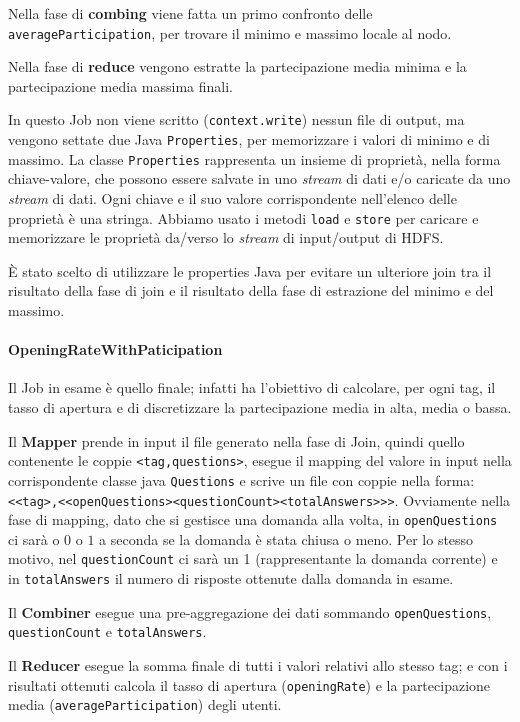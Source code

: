 \documentclass[10pt]{article}
\begin{document}
Nella fase di \textbf{combing} viene fatta un primo confronto delle\\
\texttt{averageParticipation}, per trovare il minimo e massimo locale al nodo.

Nella fase di \textbf{reduce} vengono estratte la partecipazione media minima e la partecipazione media massima finali.

In questo Job non viene scritto (\texttt{context.write}) nessun file di output, ma vengono settate due Java \texttt{Properties}, per memorizzare i valori di minimo e di massimo.
La classe \texttt{Properties} rappresenta un insieme di proprietà, nella forma chiave-valore, che possono essere salvate in uno \textit{stream} di dati e/o caricate da uno \textit{stream} di dati. Ogni chiave e il suo valore corrispondente nell'elenco delle proprietà è una stringa.
Abbiamo usato i metodi \texttt{load} e \texttt{store} per caricare e memorizzare le proprietà da/verso lo \textit{stream} di input/output di HDFS.

\`E stato scelto di utilizzare le properties Java per evitare un ulteriore join tra il risultato della fase di join e il risultato della fase di estrazione del minimo e del massimo.

\paragraph{OpeningRateWithPaticipation}
Il Job in esame è quello finale; infatti ha l'obiettivo di calcolare, per ogni tag, il tasso di apertura e di discretizzare la partecipazione media in alta, media o bassa.

Il \textbf{Mapper} prende in input il file generato nella fase di Join, quindi quello contenente le coppie \texttt{<tag,questions>}, esegue il mapping del valore in input nella corrispondente classe java \texttt{Questions} e scrive un file con coppie nella forma: \texttt{<<tag>,<<openQuestions><questionCount><totalAnswers>>>}.
Ovviamente nella fase di mapping, dato che si gestisce una domanda alla volta, in \texttt{openQuestions} ci sarà o $0$ o $1$ a seconda se la domanda è stata chiusa o meno. Per lo stesso motivo, nel \texttt{questionCount} ci sarà un 1 (rappresentante la domanda corrente) e in \texttt{totalAnswers} il numero di risposte ottenute dalla domanda in esame.

Il \textbf{Combiner} esegue una pre-aggregazione dei dati sommando
\texttt{openQuestions}, \texttt{questionCount} e \texttt{totalAnswers}.

Il \textbf{Reducer} esegue la somma finale di tutti i valori relativi allo stesso tag; e con i risultati ottenuti calcola il tasso di apertura (\texttt{openingRate}) e la partecipazione media (\texttt{averageParticipation}) degli utenti.
\end{document}

